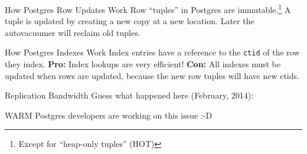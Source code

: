 \documentclass[14pt]{beamer}
\begin{document}
\begin{frame}{How Postgres Row Updates Work}
  Row ``tuples'' in Postgres are immutable.\footnote[1]{Except for ``heap-only
    tuples'' (HOT)}
  \newline
  \newline
  A tuple is updated by creating a new copy at a new location. Later the
  autovacuumer will reclaim old tuples.

\end{frame}

\begin{frame}{How Postgres Indexes Work}
  Index entries have a reference to the \texttt{ctid} of the row they index.
  \newline
  \newline
  \textbf{Pro:} Index lookups are very efficient!
  \newline
  \newline
  \textbf{Con:} All indexes must be updated when rows are updated, because the
  new row tuples will have new ctids.
\end{frame}

\begin{frame}{Replication Bandwidth}
  Guess what happened here (February, 2014):
  \newline
  \newline
\end{frame}

\begin{frame}{WARM}
  Postgres developers are working on this issue :-D
  \newline
  \newline
\end{frame}
\end{document}
